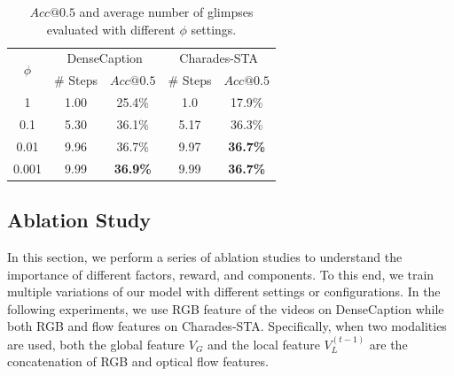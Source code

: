 \documentclass[letterpaper]{article} %
\begin{document}

\begin{table}[!t]
\centering
\begin{tabular}{ c | c | c |c |c}
  \hline	
  \multirow{2}{*}{$\phi$} & \multicolumn{2}{c|}{DenseCaption} & \multicolumn{2}{c}{Charades-STA}\\	
  \cline{2-5}
  & \# Steps & $Acc@0.5$ & \# Steps & $Acc@0.5$ \\
  \hline\hline	
  1 & 1.00&25.4\% &1.0 &17.9\% \\
  0.1 &5.30 &36.1\% &5.17 &36.3\% \\
  0.01 &9.96 &36.7\% &9.97 & \textbf{36.7\%} \\
  0.001 &9.99 & \textbf{36.9\%} &9.99 & \textbf{36.7\%} \\
  \hline
\end{tabular}
\caption{$Acc@0.5$ and average number of glimpses evaluated with different $\phi$ settings.}
\label{t:phi}
\end{table}

\subsection{Ablation Study}
In this section, we perform a series of ablation studies to understand the importance of different factors, reward, and components. To this end, we train multiple variations of our model with different settings or configurations. In the following experiments, we use RGB feature of the videos on DenseCaption while both RGB and flow features on Charades-STA. Specifically, when two modalities are used, both the global feature $V_G$ and the local feature $V_L^{(t-1)}$ are the concatenation of RGB and optical flow features.
\end{document}
